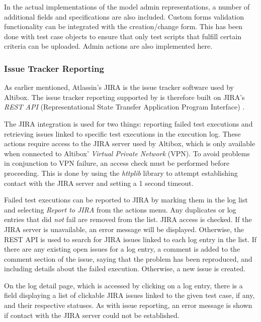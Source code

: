 In the actual implementations of the model admin representations, a number of additional fields and specifications are also included. Custom forms validation functionality can be integrated with the creation/change form. This has been done with test case objects to ensure that only test scripts that fulfill certain criteria can be uploaded. Admin actions are also implemented here.


\subsubsection{Issue Tracker Reporting}

As earlier mentioned, Atlassin's JIRA is the issue tracker software used by Altibox. The issue tracker reporting supported by \toolname \space is therefore built on JIRA's \emph{REST API} (Representational State Transfer Application Program Interface) \cite{https://www.crummy.com/writing/RESTful-Web-Services/RESTful_Web_Services.pdf}.

The JIRA integration is used for two things: reporting failed test executions and retrieving issues linked to specific test executions in the execution log. These actions require access to the JIRA server used by Altibox, which is only available when connected to Altibox' \emph{Virtual Private Network} (VPN). To avoid problems in conjunction to VPN failure, an access check must be performed before proceeding. This is done by using the \emph{httplib} library to attempt establishing contact with the JIRA server and setting a 1 second timeout.

Failed test executions can be reported to JIRA by marking them in the log list and selecting \emph{Report to JIRA} from the actions menu. Any duplicates or log entries that did \emph{not} fail are removed from the list. JIRA access is checked. If the JIRA server is unavailable, an error message will be displayed. Otherwise, the REST API is used to search for JIRA issues linked to each log entry in the list. If there are any existing open issues for a log entry, a comment is added to the comment section of the issue, saying that the problem has been reproduced, and including details about the failed execution. Otherwise, a new issue is created.

On the log detail page, which is accessed by clicking on a log entry, there is a field displaying a list of clickable JIRA issues linked to the given test case, if any, and their respective statuses. As with issue reporting, an error message is shown if contact with the JIRA server could not be established.


